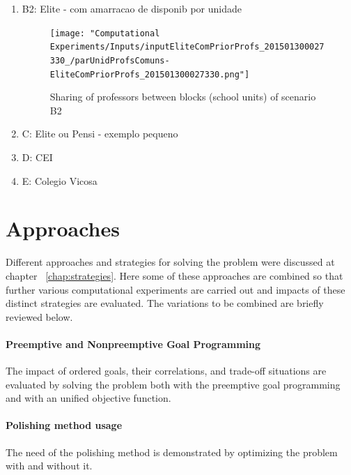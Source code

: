 \begin{enumerate}
\item B2: Elite - com amarracao de disponib por unidade

\begin{figure}[H]
\texttt{[image: "Computational Experiments/Inputs/inputEliteComPriorProfs\_201501300027330\_/parUnidProfsComuns-EliteComPriorProfs\_201501300027330.png"]}
\centering
\caption{Sharing of professors between blocks (school units) of scenario B2}
\end{figure}


\item C: Elite ou Pensi - exemplo pequeno

\item D: CEI

\item E: Colegio Vicosa

\end{enumerate}


\section{Approaches}

Different approaches and strategies for solving the problem were discussed at chapter ~\ref{chap:strategies}. Here some of these approaches are combined so that further various computational experiments are carried out and impacts of these distinct strategies are evaluated. The variations to be combined are briefly reviewed below.

\paragraph{Preemptive and Nonpreemptive Goal Programming}
The impact of ordered goals, their correlations, and trade-off situations are evaluated by solving the problem both with the preemptive goal programming and with an unified objective function.

\paragraph{Polishing method usage}
The need of the polishing method is demonstrated by optimizing the problem with and without it.

